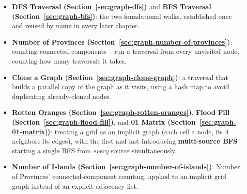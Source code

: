 \begin{patternbox}
\begin{itemize}
  \item \textbf{DFS Traversal (Section~\ref{sec:graph-dfs})} and
        \textbf{BFS Traversal (Section~\ref{sec:graph-bfs})}: the two
        foundational walks, established once and reused by name in
        every later chapter.
  \item \textbf{Number of Provinces (Section~\ref{sec:graph-number-of-provinces})}:
        counting connected components -- run a traversal from every
        unvisited node, counting how many traversals it takes.
  \item \textbf{Clone a Graph (Section~\ref{sec:graph-clone-graph})}:
        a traversal that builds a parallel copy of the graph as it
        visits, using a hash map to avoid duplicating already-cloned
        nodes.
  \item \textbf{Rotten Oranges (Section~\ref{sec:graph-rotten-oranges})},
        \textbf{Flood Fill (Section~\ref{sec:graph-flood-fill})}, and
        \textbf{01 Matrix (Section~\ref{sec:graph-01-matrix})}: treating
        a grid as an implicit graph (each cell a node, its $4$ neighbors
        its edges), with the first and last introducing
        \textbf{multi-source BFS} -- starting a single BFS from
        \emph{every} source simultaneously.
  \item \textbf{Number of Islands (Section~\ref{sec:graph-number-of-islands})}:
        Number of Provinces' connected-component counting, applied to
        an implicit grid graph instead of an explicit adjacency list.
\end{itemize}
\end{patternbox}

\newpage










